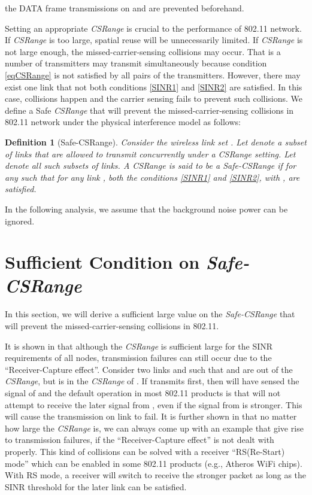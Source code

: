 \documentclass[conference]{IEEEtran}
\newtheorem{definition}{Definition}
\begin{document}
the DATA frame transmissions on  and  are prevented
beforehand.

Setting an appropriate \emph{CSRange} is crucial to the performance
of 802.11 network. If \emph{CSRange} is too large, spatial reuse
will be unnecessarily limited. If \emph{CSRange} is not large
enough, the missed-carrier-sensing collisions may occur. That is a
number of transmitters may transmit simultaneously because condition
\eqref{eqCSRange} is not satisfied by all pairs of the transmitters.
However, there may exist one link that not both conditions
\eqref{SINR1} and \eqref{SINR2} are satisf\/ied. In this case,
collisions happen and the carrier sensing fails to prevent such
collisions. We def\/ine a Safe \emph{CSRange} that will prevent the
missed-carrier-sensing collisions in 802.11 network under the
physical interference model as follows:
\begin{definition}[Safe-CSRange]
Consider the wireless link set . Let
 denote a subset of links
that are allowed to transmit concurrently under a \emph{CSRange}
setting. Let  denote all such subsets of links. A
\emph{CSRange} is said to be a \emph{Safe-CSRange} if for any
 such
that for any link , both the conditions
\eqref{SINR1} and \eqref{SINR2}, with
, are
satisf\/ied.
\end{definition}

In the following analysis, we assume that the background noise power
 can be ignored.

\section{Sufficient Condition on \emph{Safe-CSRange}}

In this section, we will derive a suff\/icient large value on the
\emph{Safe-CSRange} that will prevent the missed-carrier-sensing
collisions in 802.11.

It is shown in \cite{LiBin} that although the \emph{CSRange} is
suff\/icient large for the SINR requirements of all nodes,
transmission failures can still occur due to the ``Receiver-Capture
effect''. Consider two links  and  such that  and
 are out of the \emph{CSRange}, but  is in the
\emph{CSRange} of . If  transmits f\/irst, then  will
have sensed the signal of  and the default operation in most
802.11 products is that  will not attempt to receive the later
signal from , even if the signal from  is stronger. This
will cause the transmission on link  to fail. It is further
shown in \cite{LiBin} that no matter how large the \emph{CSRange}
is, we can always come up with an example that give rise to
transmission failures, if the ``Receiver-Capture effect'' is not
dealt with properly. This kind of collisions can be solved with a
receiver ``RS(Re-Start) mode'' which can be enabled in some 802.11
products (e.g., Atheros WiFi chips). With RS mode, a receiver will
switch to receive the stronger packet as long as the SINR threshold
 for the later link can be satisf\/ied.
\end{document}
